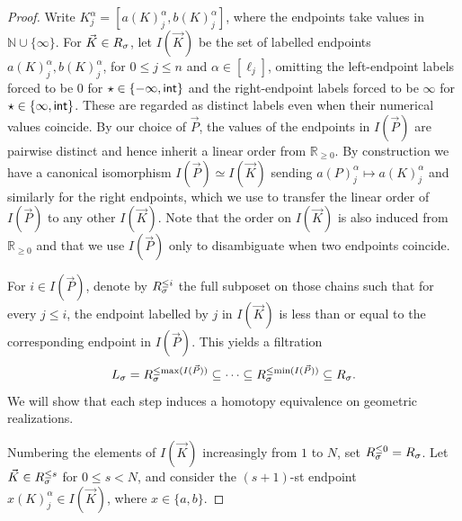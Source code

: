 \documentclass[a4paper,reqno,twoside]{amsart}
\begin{document}
\begin{proof}
Write $K_j^\alpha=[a(K)_j^\alpha,b(K)_j^\alpha]$, where the endpoints take values in $\mathbb{N}\cup\{\infty\}$. For $\vec K\in\relax{R}_\sigma$, let $I(\vec K)$ be the set of labelled endpoints $a(K)_j^\alpha,b(K)_j^\alpha$, for $0\leq j\leq n$ and $\alpha\in[\ell_j]$, omitting the left-endpoint labels forced to be $0$ for $\star \in \{-\infty,\mathsf{int}\}$ and the right-endpoint labels forced to be $\infty$ for $\star \in \{\infty,\mathsf{int}\}$. These are regarded as distinct labels even when their numerical values coincide. By our choice of $\vec P$, the values of the endpoints in $I(\vec P)$ are pairwise distinct and hence inherit a linear order from $\mathbb{R}_{\geq 0}$. By construction we have a canonical isomorphism $I(\vec{P})\simeq I(\vec{K})$ sending $a(P)^{\alpha}_j \mapsto a(K)^{\alpha}_j$ and similarly for the right endpoints, which we use to transfer the linear order of $I(\vec{P})$ to any other $I(\vec{K})$. Note that the order on $I(\vec{K})$ is also induced from $\mathbb{R}_{\geq 0}$ and that we use $I(\vec{P})$ only to disambiguate when two endpoints coincide.

For $i \in I(\vec{P})$, denote by $\relax{R}_\sigma^{\leq i}$ the full subposet on those chains such that for every $j \leq i$, the endpoint labelled by $j$ in $I(\vec{K})$ is less than or equal to the corresponding endpoint in $I(\vec{P})$. This yields a filtration
\[
	\relax{L}_\sigma=\relax{R}_{\sigma}^{\leq \max(I(\vec{P}))} \subseteq \cdots\subseteq \relax{R}_{\sigma}^{\leq \min(I(\vec{P}))} \subseteq \relax{R}_\sigma.
\]
We will show that each step induces a homotopy equivalence on geometric realizations.

Numbering the elements of $I(\vec{K})$ increasingly from $1$ to $N$, set $\relax{R}_\sigma^{\leq 0}=\relax{R}_\sigma$. Let $\vec K\in\relax{R}_\sigma^{\leq s}$ for $0\leq s<N$, and consider the $(s+1)$-st endpoint $x(K)_j^\alpha\in I(\vec K)$, where $x\in\{a,b\}$.


\end{proof}
\end{document}
